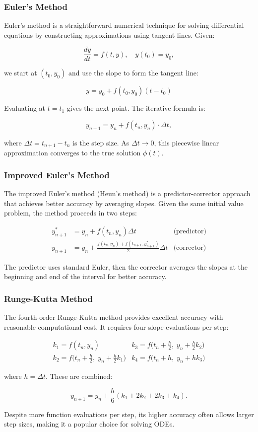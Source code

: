 \subsubsection{Euler's Method}
\label{subsubsec:euler-method}

Euler's method is a straightforward numerical technique for solving differential equations by constructing approximations using tangent lines. Given:

\[
\frac{dy}{dt} = f(t, y), \quad y(t_0) = y_0,
\]

we start at \((t_0, y_0)\) and use the slope to form the tangent line:

\[
y = y_0 + f(t_0, y_0)(t - t_0)
\]

Evaluating at \(t = t_1\) gives the next point. The iterative formula is:

\[
y_{n+1} = y_n + f(t_n, y_n) \cdot \Delta t,
\]

where \(\Delta t = t_{n+1} - t_n\) is the step size. As \(\Delta t \to 0\), this piecewise linear approximation converges to the true solution \(\phi(t)\).

\subsubsection{Improved Euler's Method}
\label{subsubsec:improved-euler}

The improved Euler's method (Heun's method) is a predictor-corrector approach that achieves better accuracy by averaging slopes. Given the same initial value problem, the method proceeds in two steps:

\[
\begin{aligned}
y_{n+1}^* &= y_n + f(t_n, y_n) \Delta t &\text{(predictor)}\\[1pt]
y_{n+1}   &= y_n + \frac{f(t_n, y_n) + f(t_{n+1}, y_{n+1}^*)}{2} \Delta t &\text{(corrector)}
\end{aligned}
\]

The predictor uses standard Euler, then the corrector averages the slopes at the beginning and end of the interval for better accuracy.

\subsubsection{Runge-Kutta Method}
\label{subsubsec:runge-kutta}

The fourth-order Runge-Kutta method provides excellent accuracy with reasonable computational cost. It requires four slope evaluations per step:

\[
\begin{array}{ll}
k_1 = f(t_n, y_n) & k_3 = f\bigl(t_n + \tfrac{h}{2},\; y_n + \tfrac{h}{2}k_2\bigr) \\[1pt]
k_2 = f\bigl(t_n + \tfrac{h}{2},\; y_n + \tfrac{h}{2}k_1\bigr) & k_4 = f\bigl(t_n + h,\; y_n + h k_3\bigr)
\end{array}
\]

where \(h = \Delta t\). These are combined:

\[
y_{n+1} = y_n + \frac{h}{6}(k_1 + 2k_2 + 2k_3 + k_4).
\]

Despite more function evaluations per step, its higher accuracy often allows larger step sizes, making it a popular choice for solving ODEs.